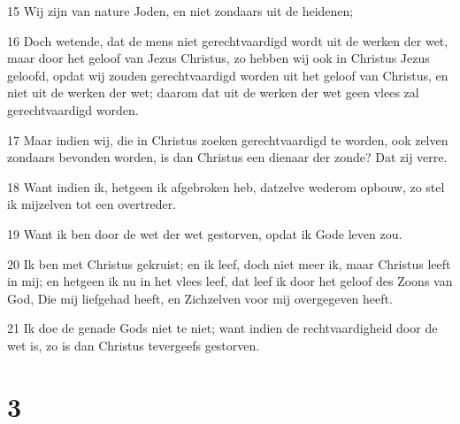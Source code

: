 \par 15 Wij zijn van nature Joden, en niet zondaars uit de heidenen;
\par 16 Doch wetende, dat de mens niet gerechtvaardigd wordt uit de werken der wet, maar door het geloof van Jezus Christus, zo hebben wij ook in Christus Jezus geloofd, opdat wij zouden gerechtvaardigd worden uit het geloof van Christus, en niet uit de werken der wet; daarom dat uit de werken der wet geen vlees zal gerechtvaardigd worden.
\par 17 Maar indien wij, die in Christus zoeken gerechtvaardigd te worden, ook zelven zondaars bevonden worden, is dan Christus een dienaar der zonde? Dat zij verre.
\par 18 Want indien ik, hetgeen ik afgebroken heb, datzelve wederom opbouw, zo stel ik mijzelven tot een overtreder.
\par 19 Want ik ben door de wet der wet gestorven, opdat ik Gode leven zou.
\par 20 Ik ben met Christus gekruist; en ik leef, doch niet meer ik, maar Christus leeft in mij; en hetgeen ik nu in het vlees leef, dat leef ik door het geloof des Zoons van God, Die mij liefgehad heeft, en Zichzelven voor mij overgegeven heeft.
\par 21 Ik doe de genade Gods niet te niet; want indien de rechtvaardigheid door de wet is, zo is dan Christus tevergeefs gestorven.

\chapter{3}

